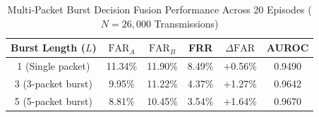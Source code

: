 \begin{table}[t]
\centering
\caption{Multi-Packet Burst Decision Fusion Performance Across 20 Episodes ($N = 26{,}000$ Transmissions)}
\label{tab:burst_aggregation}
\begin{tabular}{cccccc}
\toprule
\textbf{Burst Length ($L$)} & \textbf{$\text{FAR}_A$} & \textbf{$\text{FAR}_B$} & \textbf{FRR} & \textbf{$\Delta\text{FAR}$} & \textbf{AUROC} \\
\midrule
1 (Single packet) & 11.34\% & 11.90\% & 8.49\% & +0.56\% & 0.9490 \\
3 (3-packet burst) & 9.95\% & 11.22\% & 4.37\% & +1.27\% & 0.9642 \\
5 (5-packet burst) & 8.81\% & 10.45\% & 3.54\% & +1.64\% & 0.9670 \\
\bottomrule
\end{tabular}
\end{table}
